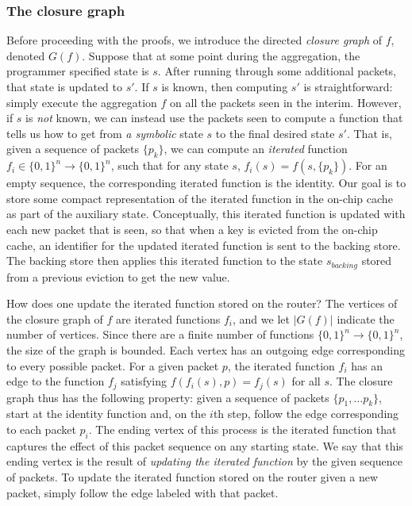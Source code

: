 
\subsubsection{The closure graph}
\label{ss:closure}

Before proceeding with the proofs, we introduce the directed \emph{closure graph} of $f$, denoted $G(f)$. Suppose that at some point during the aggregation, 
the programmer specified state is $s$. After running through some additional packets, that state is updated to $s'$. If $s$ is known, then computing
$s'$ is straightforward: simply execute the aggregation $f$ on all the packets seen in the interim. However, if $s$ is \emph{not} known, we can instead
use the packets seen to compute a function that tells us how to get from \emph{a symbolic} state $s$ to the final desired state $s'$. That is, given a sequence of packets $\{p_k\}$,
we can compute an \emph{iterated} function $f_i \in \{0,1\}^n \rightarrow \{0,1\}^n$, such that for any state $s$, $f_i(s) = f(s, \{p_k\})$. For an empty sequence, the corresponding iterated function is the identity.
Our goal is to store some compact representation of the iterated function in the on-chip cache as part of the auxiliary state. Conceptually,  this iterated function is updated with each new packet that is seen, so that when a key is evicted from the on-chip cache,
an identifier for the updated iterated function is sent to the backing store. The backing store then applies this iterated function to the state $s_{backing}$ stored from a previous eviction to get the new value.

How does one update the iterated function stored on the router? The vertices of the closure graph of $f$ are iterated functions $f_i$, and we let $|G(f)|$ indicate the number of vertices. Since there are a finite number of functions $\{0, 1\}^n \rightarrow \{0, 1\}^n$, the size of the graph is bounded.
Each vertex has an outgoing edge corresponding to every possible packet. For a given packet $p$, the iterated function $f_i$ has an edge to the function $f_j$ satisfying $f(f_i(s), p) = f_j(s)$ for all $s$.
The closure graph thus has the following property: given a sequence of packets $\{p_1, \ldots p_k\}$, start at the identity function and, on the $i$th step, follow the edge corresponding to each packet $p_i$. The ending vertex of this process is the iterated function that captures the effect of this packet sequence on any starting state. We say that this ending vertex is the result of \emph{updating the iterated function} by the given sequence of packets. To update the iterated function stored on the router given a new packet, simply follow the edge labeled with that packet.

